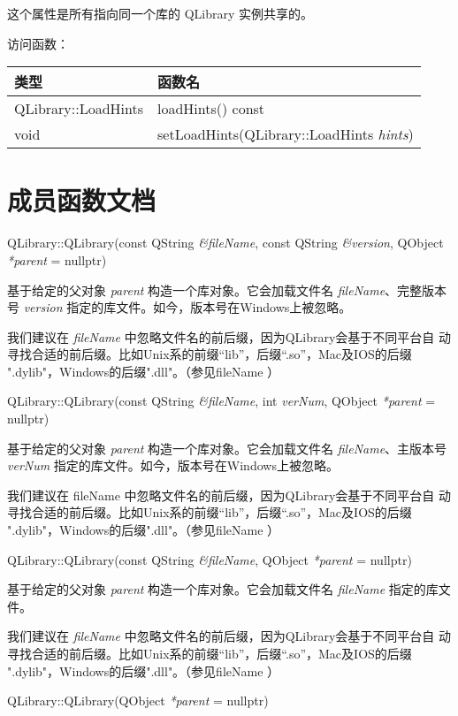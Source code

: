 \begin{notice}
这个属性是所有指向同一个库的 QLibrary 实例共享的。
\end{notice}

访问函数：

\begin{tabular}{|l|l|}
\hline
类型 	&函数名\\
\hline
QLibrary::LoadHints &	loadHints() const\\
\hline
void &	setLoadHints(QLibrary::LoadHints \emph{hints})\\
\hline
\end{tabular}

\section{成员函数文档}


QLibrary::QLibrary(const QString \emph{\&fileName}, const QString \emph{\&version}, QObject \emph{*parent} = nullptr)

基于给定的父对象 \emph{parent} 构造一个库对象。它会加载文件名 \emph{fileName}、完整版本号 \emph{version} 指定的库文件。如今，版本号在Windows上被忽略。

我们建议在 \emph{fileName} 中忽略文件名的前后缀，因为QLibrary会基于不同平台自
动寻找合适的前后缀。比如Unix系的前缀“lib”，后缀“.so”，Mac及IOS的后缀
".dylib"，Windows的后缀".dll"。（参见fileName ）

QLibrary::QLibrary(const QString \emph{\&fileName}, int \emph{verNum}, QObject \emph{*parent} = nullptr)

基于给定的父对象 \emph{parent} 构造一个库对象。它会加载文件名 \emph{fileName}、主版本号 \emph{verNum} 指定的库文件。如今，版本号在Windows上被忽略。

我们建议在 fileName 中忽略文件名的前后缀，因为QLibrary会基于不同平台自
动寻找合适的前后缀。比如Unix系的前缀“lib”，后缀“.so”，Mac及IOS的后缀
".dylib"，Windows的后缀".dll"。（参见fileName ）

QLibrary::QLibrary(const QString \emph{\&fileName}, QObject
\emph{*parent} = nullptr)

基于给定的父对象 \emph{parent} 构造一个库对象。它会加载文件名 \emph{fileName} 指定的库文件。

我们建议在 
\emph{fileName} 中忽略文件名的前后缀，因为QLibrary会基于不同平台自
动寻找合适的前后缀。比如Unix系的前缀“lib”，后缀“.so”，Mac及IOS的后缀
".dylib"，Windows的后缀".dll"。（参见fileName ）

QLibrary::QLibrary(QObject \emph{*parent} = nullptr)

